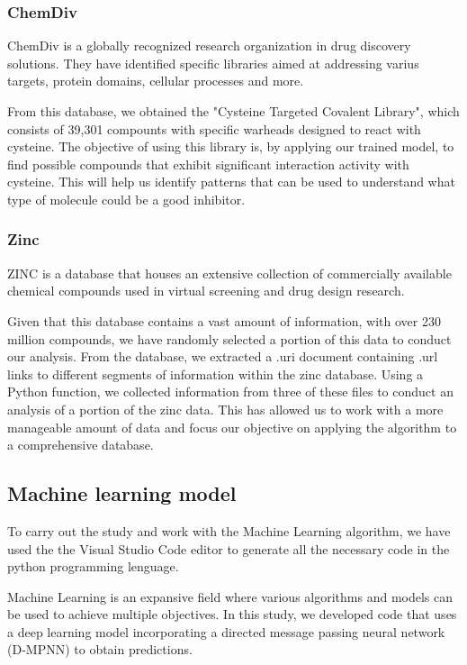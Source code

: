 \documentclass[final,times,twocolumn,article]{elsarticle}
\begin{document}
\subsubsection{ChemDiv}

ChemDiv is a globally recognized research organization in drug discovery solutions. They have identified specific libraries aimed at addressing varius targets, protein domains, cellular processes and more. \cite{chemdivweb}

From this database, we obtained the "Cysteine Targeted Covalent Library", which consists of 39,301 compounts with specific warheads designed to react with cysteine. The objective of using this library is, by applying our trained model, to find possible compounds that exhibit significant interaction activity with cysteine. This will help us identify patterns that can be used to understand what type of molecule could be a good inhibitor. 

\subsubsection{Zinc}

ZINC is a database that houses an extensive collection of commercially available chemical compounds used in virtual screening and drug design research. \cite{zincweb}

Given that this database contains a vast amount of information, with over 230 million compounds, we have randomly selected a portion of this data to conduct our analysis. From the database, we extracted a .uri document containing .url links to different segments of information within the zinc database. Using a Python function, we collected information from three of these files to conduct an analysis of a portion of the zinc data. This has allowed us to work with a more manageable amount of data and focus our objective on applying the algorithm to a comprehensive database.


\subsection{Machine learning model}

To carry out the study and work with the Machine Learning algorithm, we have used the the Visual Studio Code editor to generate all the necessary code in the python programming lenguage. 

Machine Learning is an expansive field where various algorithms and models can be used to achieve multiple objectives. In this study, we developed code that uses a deep learning model incorporating a directed message passing neural network (D-MPNN) to obtain predictions. 
\end{document}
